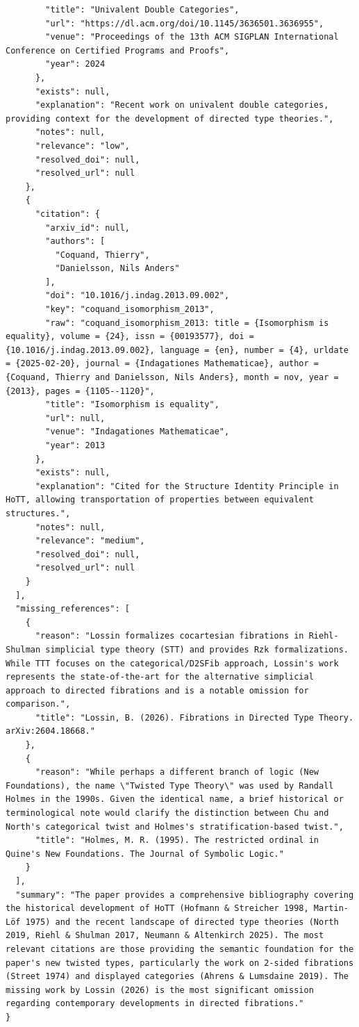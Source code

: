 \documentclass[11pt]{article}
\begin{document}
\begin{verbatim}
        "title": "Univalent Double Categories",
        "url": "https://dl.acm.org/doi/10.1145/3636501.3636955",
        "venue": "Proceedings of the 13th ACM SIGPLAN International Conference on Certified Programs and Proofs",
        "year": 2024
      },
      "exists": null,
      "explanation": "Recent work on univalent double categories, providing context for the development of directed type theories.",
      "notes": null,
      "relevance": "low",
      "resolved_doi": null,
      "resolved_url": null
    },
    {
      "citation": {
        "arxiv_id": null,
        "authors": [
          "Coquand, Thierry",
          "Danielsson, Nils Anders"
        ],
        "doi": "10.1016/j.indag.2013.09.002",
        "key": "coquand_isomorphism_2013",
        "raw": "coquand_isomorphism_2013: title = {Isomorphism is equality}, volume = {24}, issn = {00193577}, doi = {10.1016/j.indag.2013.09.002}, language = {en}, number = {4}, urldate = {2025-02-20}, journal = {Indagationes Mathematicae}, author = {Coquand, Thierry and Danielsson, Nils Anders}, month = nov, year = {2013}, pages = {1105--1120}",
        "title": "Isomorphism is equality",
        "url": null,
        "venue": "Indagationes Mathematicae",
        "year": 2013
      },
      "exists": null,
      "explanation": "Cited for the Structure Identity Principle in HoTT, allowing transportation of properties between equivalent structures.",
      "notes": null,
      "relevance": "medium",
      "resolved_doi": null,
      "resolved_url": null
    }
  ],
  "missing_references": [
    {
      "reason": "Lossin formalizes cocartesian fibrations in Riehl-Shulman simplicial type theory (STT) and provides Rzk formalizations. While TTT focuses on the categorical/D2SFib approach, Lossin's work represents the state-of-the-art for the alternative simplicial approach to directed fibrations and is a notable omission for comparison.",
      "title": "Lossin, B. (2026). Fibrations in Directed Type Theory. arXiv:2604.18668."
    },
    {
      "reason": "While perhaps a different branch of logic (New Foundations), the name \"Twisted Type Theory\" was used by Randall Holmes in the 1990s. Given the identical name, a brief historical or terminological note would clarify the distinction between Chu and North's categorical twist and Holmes's stratification-based twist.",
      "title": "Holmes, M. R. (1995). The restricted ordinal in Quine's New Foundations. The Journal of Symbolic Logic."
    }
  ],
  "summary": "The paper provides a comprehensive bibliography covering the historical development of HoTT (Hofmann & Streicher 1998, Martin-Löf 1975) and the recent landscape of directed type theories (North 2019, Riehl & Shulman 2017, Neumann & Altenkirch 2025). The most relevant citations are those providing the semantic foundation for the paper's new twisted types, particularly the work on 2-sided fibrations (Street 1974) and displayed categories (Ahrens & Lumsdaine 2019). The missing work by Lossin (2026) is the most significant omission regarding contemporary developments in directed fibrations."
}
\end{verbatim}
\end{document}
